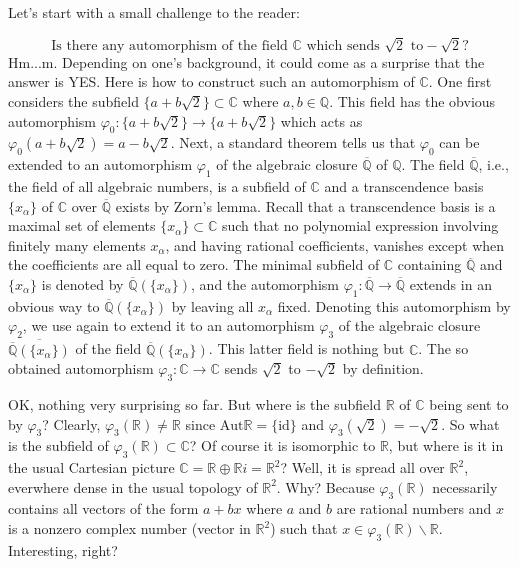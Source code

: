 \documentclass[11pt]{article}
\theoremstyle{plain}
\theoremstyle{definition}
\theoremstyle{remark}
\begin{document}
Let's start with a small challenge to the reader:





$$
\textrm{Is there any automorphism of the field } \mathbb{C} \textrm{ which sends } \sqrt{2} \textrm{ to} -\sqrt{2}?
$$
Hm...m. Depending on one's background, it could come as a surprise that the answer is YES. Here is how to construct such an automorphism of $\mathbb{C}$. One first considers the subfield $\{ a + b\sqrt{2} \} \subset \mathbb{C}$ where $a, b \in \mathbb{Q}$. This field has the obvious automorphism $\varphi_0 : \{ a + b\sqrt{2} \} \to \{ a + b\sqrt{2} \}$ which acts as $\varphi_0(a + b\sqrt{2}) = a - b\sqrt{2}$. Next, a standard theorem \cite[Ch.V, Thm.~3.8]{Hungerford} tells us that $\varphi_0$ can be extended to an automorphism $\varphi_1$ of the algebraic closure $\overline{\mathbb{Q}}$ of $\mathbb{Q}$. The field $\overline{\mathbb{Q}}$, i.e., the field of all algebraic numbers, is a subfield of $\mathbb{C}$ and a transcendence basis  $\{x_{\alpha}\}$ of $\mathbb{C}$ over $\overline{\mathbb{Q}}$ exists by Zorn's lemma. Recall that a transcendence basis is a maximal set of elements $\{x_{\alpha}\} \subset \mathbb{C}$ such that no polynomial expression involving finitely many elements $x_\alpha$, and having rational coefficients, vanishes except when the coefficients are all equal to zero. 
The minimal subfield of $\mathbb{C}$ containing $\overline{\mathbb{Q}}$ and $\{x_\alpha\}$ is denoted by $\overline{\mathbb{Q}}(\{x_{\alpha}\})$, and the automorphism $\varphi_1 : \overline{\mathbb{Q}} \to \overline{\mathbb{Q}}$ extends in an obvious way to  $\overline{\mathbb{Q}}(\{x_{\alpha}\})$ by leaving all $x_\alpha$ fixed.
Denoting this automorphism by $\varphi_2$, we use again \cite[Ch.V, Thm.~3.8]{Hungerford} to extend it to an automorphism $\varphi_3$ of the algebraic closure $\overline{\overline{\mathbb{Q}}(\{x_{\alpha}\})}$ of the field $\overline{\mathbb{Q}}(\{x_{\alpha}\})$. This latter field is nothing but $\mathbb{C}$. The so obtained automorphism $\varphi_3: \mathbb{C} \to \mathbb{C}$ sends $\sqrt{2}$ to $-\sqrt{2}$ by definition.
\par
OK, nothing very surprising so far. But where is the subfield $\mathbb{R}$ of $\mathbb{C}$ being sent to by $\varphi_3$? Clearly, $\varphi_3(\mathbb{R}) \neq \mathbb{R}$ since $\mathrm{Aut} \mathbb{R} = \{ \mathrm{id} \}$ and $\varphi_3(\sqrt{2}) = -\sqrt{2}$.
So what is the subfield of $\varphi_3(\mathbb{R}) \subset \mathbb{C}$? Of course it is isomorphic to $\mathbb{R}$, but where is it in the usual Cartesian picture $\mathbb{C} = \mathbb{R} \oplus \mathbb{R}i = \mathbb{R}^2$? Well, it is spread all over $\mathbb{R}^2$, everwhere dense in the usual topology of $\mathbb{R}^2$. Why? Because $\varphi_3(\mathbb{R})$ necessarily contains all vectors of the form $a + bx$ where $a$ and $b$ are rational numbers and $x$ is a nonzero complex number (vector in $\mathbb{R}^2$) such that $x \in \varphi_3(\mathbb{R}) \backslash \mathbb{R}$. Interesting, right?
\end{document}
